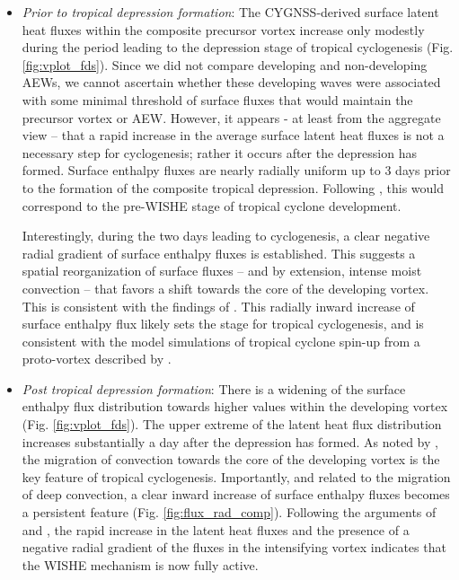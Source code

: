 \documentclass[draft]{agujournal2019}
\begin{document}
\begin{itemize}
    \item \emph{Prior to tropical depression formation}: The CYGNSS-derived surface latent heat fluxes within the composite precursor vortex increase only modestly during the period leading to the depression stage of tropical cyclogenesis (Fig. \ref{fig:vplot_fds}).  Since we did not compare developing and non-developing AEWs, we cannot ascertain whether these developing waves were associated with some minimal threshold of surface fluxes that would maintain the precursor vortex or AEW. However, it appears - at least from the aggregate view -- that a rapid increase in the average surface latent heat fluxes is not a necessary step for cyclogenesis; rather it occurs after the depression has formed.  Surface enthalpy fluxes are  nearly radially uniform up to 3 days prior to the formation of the composite tropical depression. Following  , this would correspond to the pre-WISHE stage of tropical cyclone development. 
    
    Interestingly, during the two days leading to cyclogenesis, a clear negative radial gradient of surface enthalpy fluxes is established. This suggests a spatial reorganization of surface fluxes -- and by extension, intense moist convection -- that favors a shift towards the core of the developing vortex. This is consistent with the findings of .  This radially inward increase of surface enthalpy flux likely sets the stage for tropical cyclogenesis, and is consistent with the model simulations of tropical cyclone spin-up from a proto-vortex described by . 

    \item \emph{Post tropical depression formation}: There is a widening of the surface enthalpy flux distribution towards higher values within the developing vortex (Fig. \ref{fig:vplot_fds}). The upper extreme of the latent heat flux distribution increases substantially a day after the depression has formed. As noted by \cite{WZ2018}, the  migration of convection towards the core of the developing vortex is the key feature of tropical cyclogenesis. Importantly, and related to the  migration of deep convection, a clear inward increase of surface enthalpy fluxes becomes a persistent feature (Fig. \ref{fig:flux_rad_comp}).  Following the arguments of   and , the rapid increase in the latent heat fluxes and the presence of a negative radial gradient of the fluxes in the  intensifying vortex indicates that the  WISHE mechanism is now fully active.
\end{itemize}
\end{document}
